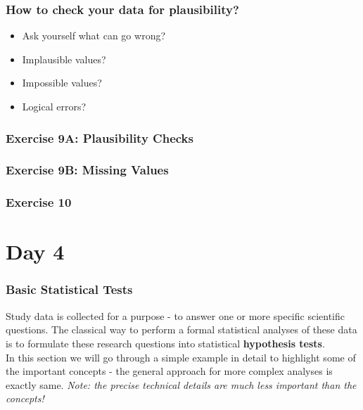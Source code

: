 \documentclass{beamer}\usepackage[]{graphicx}\usepackage[]{color}
\begin{document}
{{{%
\usebackgroundtemplate{}
\begin{frame}[fragile]
\frametitle{How to check your data for plausibility?}
\begin{itemize}
\setlength\itemsep{1.3em}
\item Ask yourself what can go wrong?
\item Implausible values?
\item Impossible values?
\item Logical errors?
\end{itemize}
\end{frame}


\begin{frame}[fragile]
\frametitle{Exercise 9A: Plausibility Checks}
\end{frame}


\begin{frame}[fragile]
\frametitle{Exercise 9B: Missing Values}
\end{frame}


\begin{frame}[fragile]
\frametitle{Exercise 10}
\end{frame}

\section{Day 4}
\usebackgroundtemplate{}
\begin{frame}
\frametitle{Basic Statistical Tests}
Study data is collected for a purpose - to answer one or more specific
scientific questions. The classical way to perform a formal statistical
analyses of these data is to formulate these research questions into
statistical {\bfseries hypothesis tests}. \\
\vspace{0.5cm}
In this section we will go through a simple example in detail to highlight
some of the important concepts - the general approach for more complex
analyses is exactly same. \emph{Note: the precise technical details are
much less important than the concepts!}
\end{frame}

}}}
\end{document}
